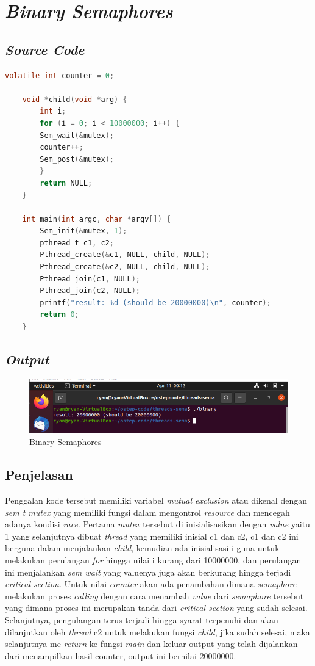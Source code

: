 \documentclass[11pt,a4paper]{article}
\begin{document}
\section{\textit{Binary Semaphores}}
\subsection{\textit{Source Code}}
    \begin{lstlisting}[language = C]
	volatile int counter = 0;

	void *child(void *arg) {
		int i;
		for (i = 0; i < 10000000; i++) {
		Sem_wait(&mutex);
		counter++;
		Sem_post(&mutex);
		}
		return NULL;
	}

	int main(int argc, char *argv[]) {
		Sem_init(&mutex, 1); 
		pthread_t c1, c2;
		Pthread_create(&c1, NULL, child, NULL);
		Pthread_create(&c2, NULL, child, NULL);
		Pthread_join(c1, NULL);
		Pthread_join(c2, NULL);
		printf("result: %d (should be 20000000)\n", counter);
		return 0;
	}
\end{lstlisting}
    \subsection{\textit{Output}}
    \begin{figure}[h]
    \centering
    \includegraphics[width=1\textwidth]{Figure/Binary.png}
    \caption{Binary Semaphores}
    \label{fig:my_label}
    \end{figure}

\subsection{Penjelasan}
    Penggalan kode tersebut memiliki variabel \textit{mutual exclusion} atau dikenal dengan \textit{sem t mutex} yang memiliki fungsi dalam mengontrol \textit{resource} dan mencegah adanya kondisi \textit{race}. Pertama \textit{mutex} tersebut di inisialisasikan dengan \textit{value} yaitu 1 yang selanjutnya dibuat \textit{thread} yang memiliki inisial c1 dan c2, c1 dan c2 ini berguna dalam menjalankan \textit{child}, kemudian ada inisialisasi i guna untuk melakukan perulangan \textit{for} hingga nilai i kurang dari 10000000, dan perulangan ini menjalankan \textit{sem wait} yang valuenya juga akan berkurang hingga terjadi \textit{critical section}. Untuk nilai \textit{counter} akan ada penambahan dimana \textit{semaphore} melakukan proses \textit{calling} dengan cara menambah \textit{value} dari \textit{semaphore} tersebut yang dimana proses ini merupakan tanda dari \textit{critical section} yang sudah selesai. Selanjutnya, pengulangan terus terjadi hingga syarat terpenuhi dan akan dilanjutkan oleh \textit{thread} c2 untuk melakukan fungsi \textit{child}, jika sudah selesai, maka selanjutnya me-\textit{return} ke fungsi \textit{main} dan keluar output yang telah dijalankan dari menampilkan hasil counter, output ini bernilai 20000000.
 
\end{document}
